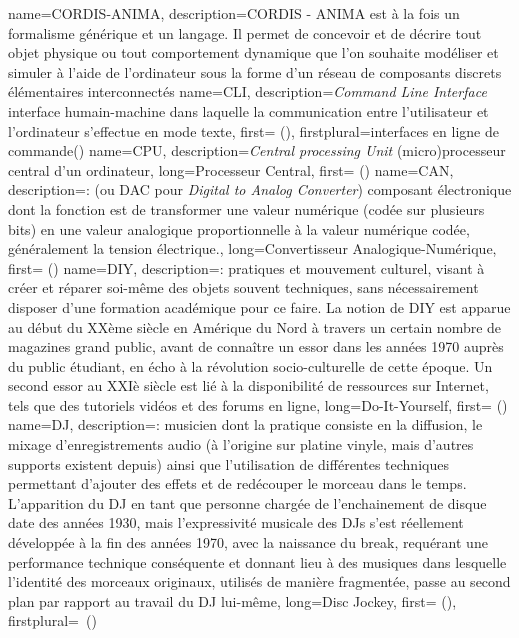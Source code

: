 {
    name={CORDIS-ANIMA},
    description={CORDIS - ANIMA est à la fois un formalisme générique et un langage. Il permet de concevoir et de décrire tout objet physique ou tout comportement dynamique que l'on souhaite modéliser et simuler à l'aide de l'ordinateur sous la forme d'un réseau de composants discrets élémentaires interconnectés}
}
{
    name={CLI},
    description={\textit{Command Line Interface} interface humain-machine dans laquelle la communication entre l'utilisateur et l'ordinateur s'effectue en mode texte},
    first={ ()},
    firstplural={interfaces en ligne de commande(\glspluralsuffix)}
}
{
    name={CPU},
    description={\textit{Central processing Unit} (micro)processeur central d'un ordinateur},
    long={Processeur Central},
    first={ ()}
}
{
    name={CAN},
    description={\textit{}: (ou DAC pour \textit{Digital to Analog Converter}) composant électronique dont la fonction est de transformer une valeur numérique (codée sur plusieurs bits) en une valeur analogique proportionnelle à la valeur numérique codée, généralement la tension électrique.},
    long={Convertisseur Analogique-Numérique},
    first={ ()}
}
{
    name={DIY},
    description={\textit{}: pratiques et mouvement culturel, visant à créer et réparer soi-même des objets souvent techniques, sans nécessairement disposer d'une formation académique pour ce faire. La notion de DIY est apparue au début du XXème siècle en Amérique du Nord à travers un certain nombre de magazines grand public, avant de connaître un essor dans les années 1970 auprès du public étudiant, en écho à la révolution socio-culturelle de cette époque. Un second essor au XXIè siècle est lié à la disponibilité de ressources sur Internet, tels que des tutoriels vidéos et des forums en ligne},
    long={Do-It-Yourself},
    first={ ()}
}
{
    name={DJ},
    description={\textit{}: musicien dont la pratique consiste en la diffusion, le mixage d'enregistrements audio (à l'origine sur platine vinyle, mais d'autres supports existent depuis) ainsi que l'utilisation de différentes techniques permettant d'ajouter des effets et de redécouper le morceau dans le temps. L'apparition du DJ en tant que personne chargée de l'enchainement de disque date des années 1930, mais l'expressivité musicale des DJs s'est réellement développée à la fin des années 1970, avec la naissance du break, requérant une performance technique conséquente et donnant lieu à des musiques dans lesquelle l'identité des morceaux originaux, utilisés de manière fragmentée, passe au second plan par rapport au travail du DJ lui-même},
    long={Disc Jockey},
    first={ ()},
    firstplural={\glspluralsuffix\ (\glspluralsuffix)}
}
